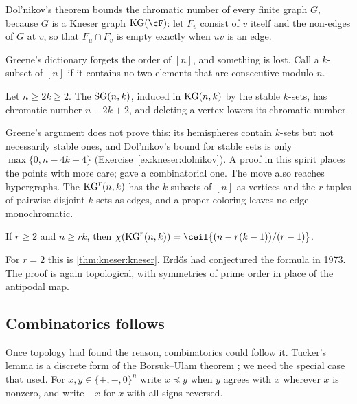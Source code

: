 \begin{refsection}
Dol'nikov's theorem bounds the chromatic number of every finite graph $G$, because $G$ is a Kneser graph $\kneserKG(\cF)$: let $F_v$ consist of $v$ itself and the non-edges of $G$ at $v$, so that $F_u\cap F_v$ is empty exactly when $uv$ is an edge.

Greene's dictionary forgets the order of $[n]$, and something is lost. Call a $k$-subset of $[n]$  if it contains no two elements that are consecutive modulo $n$.

\begin{theorem}\label{thm:kneser:schrijver}
Let $n\ge2k\ge2$. The  $\mathrm{SG}(n,k)$, induced in $\mathrm{KG}(n,k)$ by the stable $k$-sets, has chromatic number $n-2k+2$, and deleting a vertex lowers its chromatic number.
\end{theorem}

Greene's argument does not prove this: its hemispheres contain $k$-sets but not necessarily stable ones, and Dol'nikov's bound for stable sets is only $\max\{0,n-4k+4\}$ (Exercise~\ref{ex:kneser:dolnikov}). A proof in this spirit places the points with more care; \textcite{Ziegler2002} gave a combinatorial one. The move also reaches hypergraphs. The  $\mathrm{KG}^r(n,k)$ has the $k$-subsets of $[n]$ as vertices and the $r$-tuples of pairwise disjoint $k$-sets as edges, and a proper coloring leaves no edge monochromatic.

\begin{theorem}\label{thm:kneser:afl}
If $r\ge2$ and $n\ge rk$, then $\chi(\kneserKG^r(n,k))=\ceil{(n-r(k-1))/(r-1)}$.
\end{theorem}

For $r=2$ this is \cref{thm:kneser:kneser}. Erd\H{o}s had conjectured the formula in 1973. The proof is again topological, with symmetries of prime order in place of the antipodal map.

\subsection{Combinatorics follows}

Once topology had found the reason, combinatorics could follow it. Tucker's lemma is a discrete form of the Borsuk--Ulam theorem \parencite{Tucker1946}; we need the special case that \textcite{Matousek2004} used. For $x,y\in\{+,-,0\}^n$ write $x\preceq y$ when $y$ agrees with $x$ wherever $x$ is nonzero, and write $-x$ for $x$ with all signs reversed.


\end{refsection}
